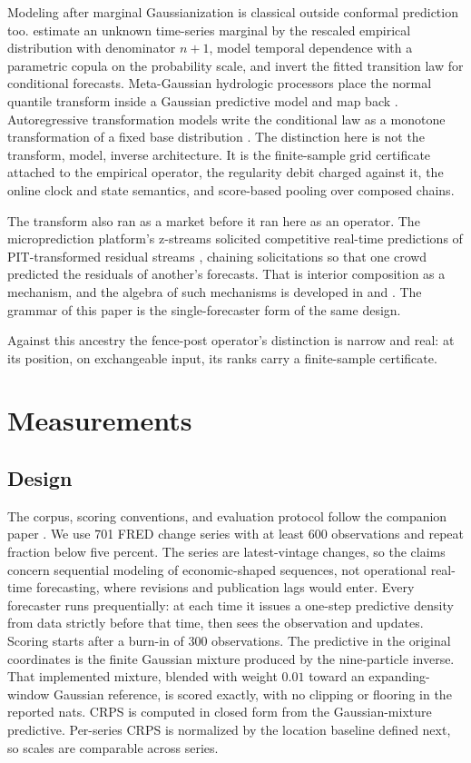 \documentclass[11pt]{article}
\theoremstyle{remark}
\begin{document}
Modeling after marginal Gaussianization is classical outside conformal prediction
too. \citet{chenfan2006} estimate an unknown time-series marginal by the rescaled
empirical distribution with denominator $n + 1$, model temporal dependence with a
parametric copula on the probability scale, and invert the fitted transition law for
conditional forecasts. Meta-Gaussian hydrologic processors place the normal quantile
transform inside a Gaussian predictive model and map back \citep{bogner2012normal}.
Autoregressive transformation models write the conditional law as a monotone
transformation of a fixed base distribution \citep{rugamer2023autoregressive}. The
distinction here is not the transform, model, inverse architecture. It is the
finite-sample grid certificate attached to the empirical operator, the regularity
debit charged against it, the online clock and state semantics, and score-based
pooling over composed chains.

The transform also ran as a market before it ran here as an operator. The
microprediction platform's z-streams solicited competitive real-time predictions of
PIT-transformed residual streams \citep{cotton2022microprediction}, chaining
solicitations so that one crowd predicted the residuals of another's forecasts. That is
interior composition as a mechanism, and the algebra of such mechanisms is developed in
\citet{cotton2026algebra} and \citet{cotton2026multistage}. The grammar of this paper
is the single-forecaster form of the same design.

Against this ancestry the
fence-post operator's distinction is narrow and real: at its position, on exchangeable
input, its ranks carry a finite-sample certificate.

\section{Measurements}\label{sec:experiments}

\subsection{Design}\label{sec:design}

The corpus, scoring conventions, and evaluation protocol follow the companion paper
\citep{cotton2026gap}. We use 701 FRED change series with at least 600 observations and
repeat fraction below five percent. The series are latest-vintage changes, so the claims
concern sequential modeling of economic-shaped sequences, not operational real-time
forecasting, where revisions and publication lags would enter. Every forecaster runs prequentially: at each time it
issues a one-step predictive density from data strictly before that time, then sees the
observation and updates. Scoring starts after a burn-in of 300 observations. The predictive in the original coordinates is the finite Gaussian mixture produced by
the nine-particle inverse. That implemented mixture, blended with weight $0.01$ toward
an expanding-window Gaussian reference, is scored exactly, with no clipping or
flooring in the reported nats. CRPS is computed in closed
form from the Gaussian-mixture predictive. Per-series CRPS is normalized by the location
baseline defined next, so scales are comparable across series.
\end{document}
